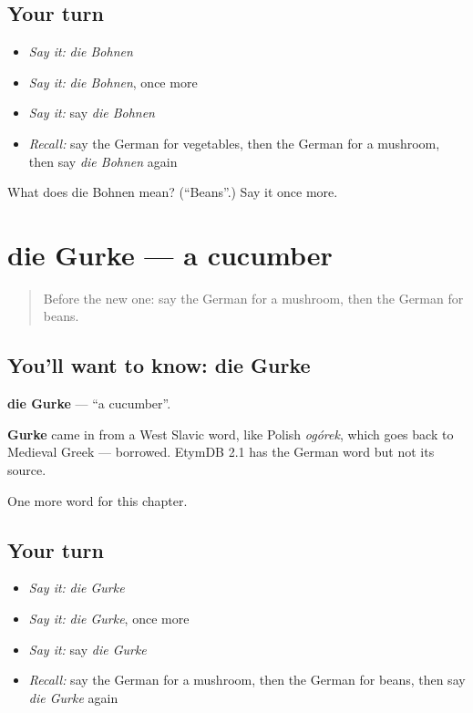 \subsection*{Your turn}
\begin{itemize}
\raggedright
  \item \emph{Say it:} \emph{die Bohnen}
  \item \emph{Say it:} \emph{die Bohnen}, once more
  \item \emph{Say it:} say \emph{die Bohnen}
  \item \emph{Recall:} say the German for vegetables, then the German for a mushroom, then say \emph{die Bohnen} again
\end{itemize}

\begin{tcolorbox}[breakable,colback=teal!4,colframe=teal!35!black,title={Before you move on}]
What does die Bohnen mean? (\textquotedblleft{}Beans\textquotedblright{}.) Say it once more.
\end{tcolorbox}
\section[die Gurke]{die Gurke — a cucumber}

\label{lesson:GE-C121-gurke}



\begin{quote}
Before the new one: say the German for a mushroom, then the German for beans.
\end{quote}

\subsection*{You'll want to know: die Gurke}
\textbf{die Gurke} — \textquotedblleft{}a cucumber\textquotedblright{}.

\begin{cousinweb}
\textbf{Gurke} came in from a West Slavic word, like Polish \emph{ogórek}, which goes back to Medieval Greek — borrowed. EtymDB 2.1 has the German word but not its source.
\end{cousinweb}

\begin{grammarlens}[title={What you've built}]
One more word for this chapter.
\end{grammarlens}

\subsection*{Your turn}
\begin{itemize}
\raggedright
  \item \emph{Say it:} \emph{die Gurke}
  \item \emph{Say it:} \emph{die Gurke}, once more
  \item \emph{Say it:} say \emph{die Gurke}
  \item \emph{Recall:} say the German for a mushroom, then the German for beans, then say \emph{die Gurke} again
\end{itemize}

